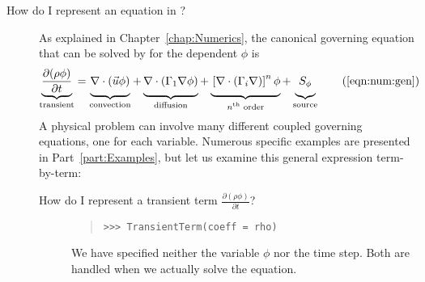 \begin{description}
    
    \item[How do I represent an equation in \FiPy{}?]  
    
    As explained in Chapter~\ref{chap:Numerics}, the canonical
    governing equation that can be solved by \FiPy{} for the dependent
     $\phi$ is
        \begin{equation}                        
             \underbrace{
               \frac{\partial (\rho \phi)}{\partial t}
             }_{\text{transient}}
             =
             \underbrace{
               \vphantom{\frac{\partial (\rho \phi)}{\partial t}}
               \nabla \cdot \left( \vec{u} \phi \right)
             }_{\text{convection}}
             +
             \underbrace{
               \vphantom{\frac{\partial (\rho \phi)}{\partial t}}
               \nabla \cdot \left( \Gamma_1 \nabla \phi \right) 
             }_{\text{diffusion}}
             +
             \underbrace{
               \vphantom{\frac{\partial (\rho \phi)}{\partial t}}
               \left[ \nabla \cdot \left( \Gamma_i \nabla \right) \right]^n \phi
             }_{\text{$n$\textsuperscript{th} order}}
             +
             \underbrace{
               \vphantom{\frac{\partial (\rho \phi)}{\partial t}}
               S_{\phi}
             }_{\text{source}}
             \tag{\ref{eqn:num:gen}}
        \end{equation}
        A physical problem can involve many different coupled
        governing equations, one for each variable.  Numerous specific
        examples are presented in Part~\ref{part:Examples}, but let us
        examine this general expression term-by-term:
        
        \begin{description}
            
            \item[How do I represent a transient term 
            $\frac{\partial (\rho \phi)}{\partial t}$?]
            \hspace*{\fill}
            
            \begin{quote}
\begin{verbatim}
>>> TransientTerm(coeff = rho)
\end{verbatim}
            \end{quote}
          
            \begin{reSTadmonition}[Note]
                We have specified neither the variable $\phi$ nor the time
                step.  Both are handled when we actually solve the equation.
            \end{reSTadmonition}
            

\end{description}
\end{description}

